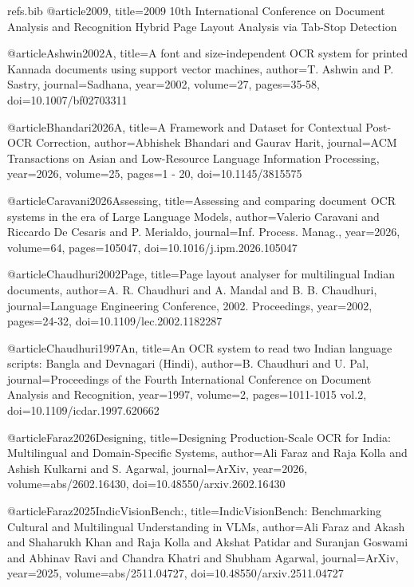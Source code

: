 
\begin{filecontents}{refs.bib}
    @article{2009,
    title={2009 10th International Conference on Document Analysis and Recognition Hybrid Page Layout Analysis via Tab-Stop Detection}
    }
    
    @article{Ashwin2002A,
    title={A font and size-independent OCR system for printed Kannada documents using support vector machines},
    author={T. Ashwin and P. Sastry},
    journal={Sadhana},
    year={2002},
    volume={27},
    pages={35-58},
    doi={10.1007/bf02703311}
    }
    
    @article{Bhandari2026A,
    title={A Framework and Dataset for Contextual Post-OCR Correction},
    author={Abhishek Bhandari and Gaurav Harit},
    journal={ACM Transactions on Asian and Low-Resource Language Information Processing},
    year={2026},
    volume={25},
    pages={1 - 20},
    doi={10.1145/3815575}
    }
    
    @article{Caravani2026Assessing,
    title={Assessing and comparing document OCR systems in the era of Large Language Models},
    author={Valerio Caravani and Riccardo De Cesaris and P. Merialdo},
    journal={Inf. Process. Manag.},
    year={2026},
    volume={64},
    pages={105047},
    doi={10.1016/j.ipm.2026.105047}
    }
    
    @article{Chaudhuri2002Page,
    title={Page layout analyser for multilingual Indian documents},
    author={A. R. Chaudhuri and A. Mandal and B. B. Chaudhuri},
    journal={Language Engineering Conference, 2002. Proceedings},
    year={2002},
    pages={24-32},
    doi={10.1109/lec.2002.1182287}
    }
    
    @article{Chaudhuri1997An,
    title={An OCR system to read two Indian language scripts: Bangla and Devnagari (Hindi)},
    author={B. Chaudhuri and U. Pal},
    journal={Proceedings of the Fourth International Conference on Document Analysis and Recognition},
    year={1997},
    volume={2},
    pages={1011-1015 vol.2},
    doi={10.1109/icdar.1997.620662}
    }
    
    @article{Faraz2026Designing,
    title={Designing Production-Scale OCR for India: Multilingual and Domain-Specific Systems},
    author={Ali Faraz and Raja Kolla and Ashish Kulkarni and S. Agarwal},
    journal={ArXiv},
    year={2026},
    volume={abs/2602.16430},
    doi={10.48550/arxiv.2602.16430}
    }
    
    @article{Faraz2025IndicVisionBench:,
    title={IndicVisionBench: Benchmarking Cultural and Multilingual Understanding in VLMs},
    author={Ali Faraz and Akash and Shaharukh Khan and Raja Kolla and Akshat Patidar and Suranjan Goswami and Abhinav Ravi and Chandra Khatri and Shubham Agarwal},
    journal={ArXiv},
    year={2025},
    volume={abs/2511.04727},
    doi={10.48550/arxiv.2511.04727}
    }
    

\end{filecontents}
